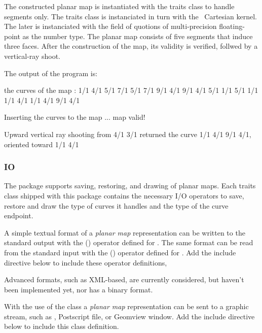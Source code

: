 The constructed planar map is instantiated with the
 traits class to handle segments only.
The traits class is instanciated in turn with the \cgal\ Cartesian kernel.
The later is instanciated with the field of quotions of multi-precision
floating-point as the number type. The planar map consists of five segments
that induce three faces. After the construction of the map, its validity
is verified, follwed by a vertical-ray shoot.


The output of the program is:

\begin{ccExampleCode}
the curves of the map :
1/1 4/1 5/1 7/1
5/1 7/1 9/1 4/1
9/1 4/1 5/1 1/1
5/1 1/1 1/1 4/1
1/1 4/1 9/1 4/1

Inserting the curves to the map ... map valid!

Upward vertical ray shooting from 4/1 3/1
returned the curve 1/1 4/1 9/1 4/1, oriented toward 1/1 4/1
\end{ccExampleCode}

\subsubsection{IO}
The  package supports saving, restoring, and drawing
of planar maps. Each traits class shipped with this package contains
the necessary I/O operators to save, restore and draw the type of
curves it handles and the type of the curve endpoint.

A simple textual format of a {\em planar map} representation can be
written to the standard output with the  (\ccc{ >> })
operator defined for . The same format can be read
from the standard input with the  (\ccc{ << }) operator
defined for . Add the include directive below to
include these operator definitions,


Advanced formats, such as XML-based, are currently considered, but
haven't been implemented yet, nor has a binary format.

With the use of the  class a {\em planar map}
representation can be sent to a graphic stream, such as
, Postscript file, or Geomview window.
Add the include directive below to include this class definition.


